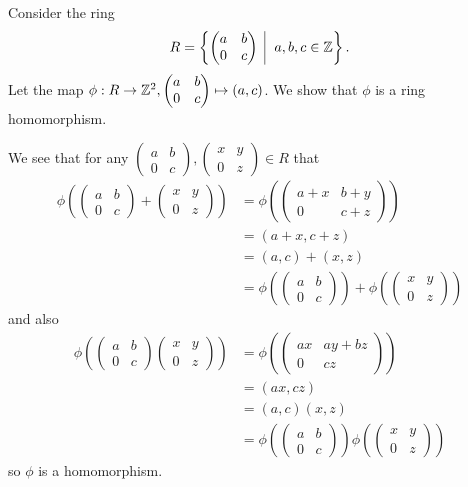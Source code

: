 \begin{example}
    Consider the ring
    \[
        R = \left\{\begin{pmatrix}a&b\\0&c\end{pmatrix}\vert a,b,c\in\Z\right\}.
    \]
    Let the map $\phi: R \to \mathbb{Z}^2, \begin{pmatrix}a&b\\0&c\end{pmatrix} \mapsto (a,c)$. We show that $\phi$ is a ring homomorphism.

    We see that for any $\begin{pmatrix}a&b\\0&c\end{pmatrix}, \begin{pmatrix}x&y\\0&z\end{pmatrix} \in R$ that
    \begin{align*}
        \phi\left(\begin{pmatrix}a&b\\0&c\end{pmatrix} + \begin{pmatrix}x&y\\0&z\end{pmatrix}\right) &= \phi\left(\begin{pmatrix}a+x&b+y\\0&c+z\end{pmatrix}\right)\\
        &= (a+x,c+z)\\
        &= (a,c) + (x,z)\\
        &= \phi\left(\begin{pmatrix}a&b\\0&c\end{pmatrix}\right) + \phi\left(\begin{pmatrix}x&y\\0&z\end{pmatrix}\right)
    \end{align*}
    and also
    \begin{align*}
        \phi\left(\begin{pmatrix}a&b\\0&c\end{pmatrix}\begin{pmatrix}x&y\\0&z\end{pmatrix}\right) &= \phi\left(\begin{pmatrix}ax&ay+bz\\0&cz\end{pmatrix}\right)\\
        &= (ax, cz)\\
        &= (a,c)(x,z)\\
        &= \phi\left(\begin{pmatrix}a&b\\0&c\end{pmatrix}\right)\phi\left(\begin{pmatrix}x&y\\0&z\end{pmatrix}\right)
    \end{align*}
    so $\phi$ is a homomorphism.
\end{example}
